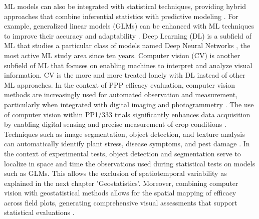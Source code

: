 \documentclass[12pt,a4paper,oneside]{report}
\begin{document}
ML models can also be integrated with statistical techniques, providing hybrid approaches 
that combine inferential statistics with predictive modeling \cite{hastieElementsStatisticalLearning2009}. 
For example, generalized linear models (GLMs) can be enhanced with ML techniques to improve 
their accuracy and adaptability \cite{salinasruizGeneralizedLinearMixed2023}. 
Deep Learning (DL) is a subfield of ML that studies a particular class of models named Deep
Neural Networks \cite{goodfellowDeepLearning2016}, the most active ML study area since ten years.
Computer vision (CV) is another subfield of 
ML that focuses on enabling machines to interpret and analyze visual information. 
CV is the more and more treated lonely with DL instead of other ML approaches. In 
the context of PPP efficacy evaluation, computer vision methods are 
increasingly used for automated observation and measurement, particularly when integrated 
with digital imaging and photogrammetry \cite{luInstanceFusionRealtimeInstancelevel2020}. The use of computer vision 
within PP1/333 trials significantly enhances data acquisition by enabling digital sensing 
and precise measurement of crop conditions \cite{barbedoAutomaticMethodDetect2014,arnalbarbedoDigitalImageProcessing2013}. 
Techniques such as image 
segmentation, object detection, and texture analysis can automatically identify plant stress, 
disease symptoms, and pest damage \cite{kamilarisDeepLearningAgriculture2018}. In the context of experimental tests, object detection and 
segmentation serve to localize in space and time the observations used during statistical tests on models such as GLMs.
This allows the exclusion of spatiotemporal variability as explained in the next chapter 'Geostatistics'.
Moreover, combining computer 
vision with geostatistical methods allows for the spatial mapping of efficacy across field plots, 
generating comprehensive visual assessments that support statistical evaluations 
\cite{koldasbayevaChallengesDatadrivenGeospatial2024}.
\end{document}
